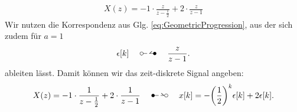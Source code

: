 \documentclass[11pt,a4paper,DIV=12]{scrartcl}
\begin{document}
\begin{align}
	X(z)=-1\cdot\frac{z}{z-\frac{1}{2}}+2\cdot\frac{z}{z-1}
\end{align}
Wir nutzen die Korrespondenz aus Glg. \eqref{eq:GeometricProgression}, aus der sich zudem für $a=1$
\begin{align}
	\epsilon[k]\quad\ztransf\quad\frac{z}{z-1}.
\end{align}
ableiten lässt.
Damit können wir das zeit-diskrete Signal angeben:
\begin{align}
	X(z)=-1\cdot\frac{1}{z-\frac{1}{2}}+2\cdot\frac{1}{z-1}\quad\Ztransf\quad x[k]=-\bigg(\frac{1}{2}\bigg)^k\epsilon[k]+2\epsilon[k].
\end{align}
\end{document}
